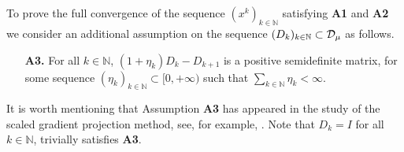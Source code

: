 To  prove  the full convergence of the  sequence  $(x^k)_{k\in\mathbb{N}}$ satisfying {\bf A1} and {\bf A2} we consider an additional assumption on the sequence $(D_k)_{k\in {\mathbb N}}\subset {\cal D}_{\mu}$ as follows.
\begin{itemize}
	\item[{\bf A3.}] For all $k \in \mathbb{N}$,   $(1+\eta_k)D_k-  D_{k+1}$ is  a positive semidefinite matrix, for some sequence $(\eta_k)_{k\in\mathbb{N}}\subset [0, +\infty)$ such that $\sum_{k\in \mathbb{N}}\eta_k<\infty$.
	\end{itemize}
It is worth mentioning that Assumption  {\bf A3} has appeared in the study of the scaled gradient projection method, see, for example, \cite{bonettini2019recent}. Note that $D_k= I$ for all $k\in {\mathbb N}$, trivially satisfies {\bf A3}.

